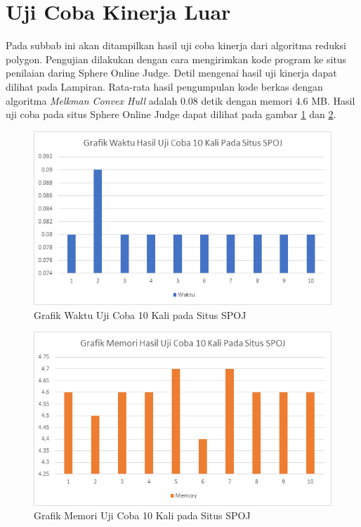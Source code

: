 \section{ Uji Coba Kinerja Luar}
Pada subbab ini akan ditampilkan hasil uji coba kinerja dari algoritma reduksi polygon. Pengujian dilakukan dengan cara mengirimkan kode program ke situs penilaian daring Sphere Online Judge. Detil mengenai hasil uji kinerja dapat dilihat pada Lampiran. Rata-rata hasil pengumpulan kode berkas dengan algoritma \textit{Melkman Convex Hull} adalah 0.08 detik dengan memori 4.6 MB. Hasil uji coba pada situs Sphere Online Judge dapat dilihat pada gambar \ref{fig:grafik-waktu-uji-coba-spoj} dan \ref{fig:grafik-memori-uji-coba-spoj}.
\begin{figure}[!h]
	\Centering
	\includegraphics [width=\columnwidth]{bab5/img/grafik-waktu-uji-coba-spoj}
	\caption {Grafik Waktu Uji Coba 10 Kali pada Situs SPOJ}
	\label {fig:grafik-waktu-uji-coba-spoj}
\end{figure}
\begin{figure}[!h]
	\Centering
	\includegraphics [width=\columnwidth]{bab5/img/grafik-memori-uji-coba-spoj}
	\caption {Grafik Memori Uji Coba 10 Kali pada Situs SPOJ}
	\label {fig:grafik-memori-uji-coba-spoj}
\end{figure}

